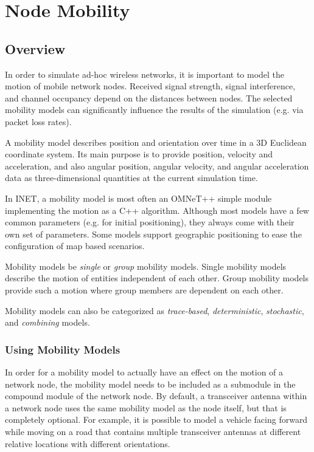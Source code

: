 \chapter{Node Mobility}
\label{cha:mobility}

\section{Overview}

In order to simulate ad-hoc wireless networks, it is important to model the
motion of mobile network nodes. Received signal strength, signal
interference, and channel occupancy depend on the distances between nodes.
The selected mobility models can significantly influence the results of the
simulation (e.g. via packet loss rates).

A mobility model describes position and orientation over time in a 3D
Euclidean coordinate system. Its main purpose is to provide position,
velocity and acceleration, and also angular position, angular velocity,
and angular acceleration data as three-dimensional quantities at the 
current simulation time.

In INET, a mobility model is most often an OMNeT++ simple module
implementing the motion as a C++ algorithm. Although most models have a few
common parameters (e.g. for initial positioning), they always come with
their own set of parameters. Some models support geographic positioning to
ease the configuration of map based scenarios.

Mobility models be \textit{single} or \textit{group} mobility models.
Single mobility models describe the motion of entities independent of each other. 
Group mobility models provide such a motion where group members are dependent
on each other.

Mobility models can also be categorized as \textit{trace-based}, 
\textit{deterministic}, \textit{stochastic}, and \textit{combining} models.

\subsection*{Using Mobility Models}

In order for a mobility model to actually have an effect on the motion of a network node,
the mobility model needs to be included as a submodule in the compound module of the
network node. By default, a transceiver antenna within a network node uses
the same mobility model as the node itself, but that is completely optional.
For example, it is possible to model a vehicle facing forward while moving 
on a road that contains multiple transceiver antennas at different relative 
locations with different orientations.


